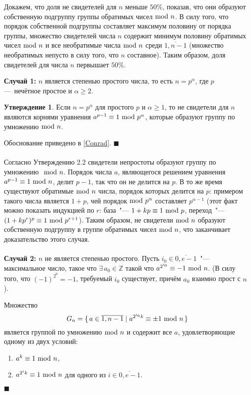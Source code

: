 \documentclass[12pt]{article}
\theoremstyle{definition}
\newtheorem{St}{Утверждение}
\numberwithin{Def}{section}
\numberwithin{Th}{section}
\numberwithin{St}{section}
\newenvironment{Proof}                    
        {\par\noindent{\bf Доказательство.}}
        {\hfill$\scriptstyle\blacksquare$}
\newcommand{\Set}[2]{
  \{\, #1 \mid #2 \, \}
}
\begin{document}
\begin{Proof}
	Докажем, что доля не свидетелей для $n$ меньше $50\%$, показав, что они
	образуют собственную подгруппу группы обратимых чисел$\ \mathrm{mod}\ n$. В силу того,
	что порядок собственной подгруппы составляет максимум половину от порядка
	группы, множество свидетелей числа $n$ содержит минимум половину обратимых
	чисел$\ \mathrm{mod}\ n$ и все необратимые числа$\ \mathrm{mod}\ n$ среди $\overline{1,n-1}$
	(множество необратимых непусто в силу того, что $n$ составное).
	Таким образом, доля свидетелей для числа $n$ первышает $50\%$.
	
	\textbf{Случай 1:} $n$ является степенью простого числа,
	то есть $n=p^\alpha$, где $p$ — нечётное простое и $\alpha\geqslant 2$.
	
	\begin{St}
		Если $n=p^\alpha$ для простого $p$ и $\alpha\geqslant 1$, то
		не свидетели для $n$ являются корнями уравнения
		$a^{p-1}\equiv 1\ \mathrm{mod}\ p^\alpha$, которые образуют группу по
		умножению$\ \mathrm{mod}\ n$.
	\end{St}
	
	\begin{Proof}
		Обоснование приведено в \ref{Conrad}.
	\end{Proof}
	\\\\
	Согласно Утверждению 2.2 свидетели непростоты образуют группу по умножению
	$\ \mathrm{mod}\ n$. Порядок числа $a$, являющегося решением уравнения
	$a^{p-1}\equiv1\ \mathrm{mod}\ n$, делит $p-1$, так что он не делится на $p$. В то же
	время существуют обратимые$\ \mathrm{mod}\ n$ числа, порядок которых делится на $p$:
	примером такого числа является $1+p$, чей порядок$\ \mathrm{mod}\ p^\alpha$ составляет
	$p^{\alpha-1}$ (этот факт можно показать индукцией по $r$: база~"---
	$1+kp\equiv 1\ \mathrm{mod}\ p$, переход~"--- $(1+kp^r)^p\equiv 1\ \mathrm{mod}\ p^{r+1}$).
	Таким образом, не свидетели$\ \mathrm{mod}\ n$ образуют собственную подгруппу в группе
	обратимых чисел$\ \mathrm{mod}\ n$, что заканчивает доказательство этого случая.
	\\\\
	\textbf{Случай 2:} $n$ не является степенью простого. Пусть
	$i_0\in\overline{0,e-1}$~"--- максимальное число, такое что
	$\exists\,a_0\in\mathbb{Z}$ такой что $a^{2^{i_0}}\equiv-1\ \mathrm{mod}\ n$.
	(В силу того, что $(-1)^{2^0}=-1$, требуемый $i_0$ существует, причём
	$a_0$ взаимно прост с $n$).
		
	Множество
	$$
	G_n=\Set{a\in\overline{1,n-1}}{a^{2^{i_0}k}\equiv\pm1\Mod{n}}
	$$ 
	является группой по умножению$\ \mathrm{mod}\ n$ и содержит все $a$, удовлетворяющие
	одному из двух условий:
	\begin{enumerate}[(1)]
		\item $a^k\equiv 1\ \mathrm{mod}\ n$,
		\item $a^{2^ik}\equiv 1\ \mathrm{mod}\ n$ для одного из $i\in\overline{0,e-1}$.
	\end{enumerate}
	

\end{Proof}
\end{document}
